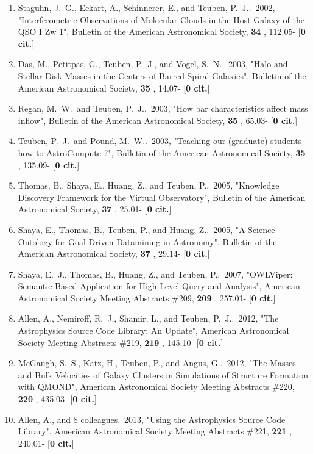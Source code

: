 \documentclass[11pt,letterpaper]{article}
\begin{document}
\begin{enumerate}[resume,label=\textbf{\arabic*}.]
\item  
Staguhn, J.~G., Eckart, A., Schinnerer, E., and Teuben, P.~J..\  2002,  
"Interferometric Observations of Molecular Clouds in the Host Galaxy of the 
QSO I Zw 1", Bulletin of the American Astronomical Society,  {\bf 34} , 
112.05- [{\bf 0 cit.}] 
\item  
Das, M., Petitpas, G., Teuben, P.~J., and Vogel, S.~N..\  2003,  "Halo and 
Stellar Disk Masses in the Centers of Barred Spiral Galaxies", Bulletin of 
the American Astronomical Society,  {\bf 35} , 14.07- [{\bf 0 cit.}] 

\item  
Regan, M.~W.~and Teuben, P.~J..\  2003,  "How bar characteristics affect 
mass inflow", Bulletin of the American Astronomical Society,  {\bf 35} , 
65.03- [{\bf 0 cit.}] 

\item  
Teuben, P.~J.~and Pound, M.~W..\  2003,  "Teaching our (graduate) students 
how to AstroCompute ?", Bulletin of the American Astronomical Society,  
{\bf 35} , 135.09- [{\bf 0 cit.}] 
\item  
Thomas, B., Shaya, E., Huang, Z., and Teuben, P..\  2005,  "Knowledge 
Discovery Framework for the Virtual Observatory", Bulletin of the American 
Astronomical Society,  {\bf 37} , 25.01- [{\bf 0 cit.}] 

\item  
Shaya, E., Thomas, B., Teuben, P., and Huang, Z..\  2005,  "A Science 
Ontology for Goal Driven Datamining in Astronomy", Bulletin of the American 
Astronomical Society,  {\bf 37} , 29.14- [{\bf 0 cit.}] 

\item  
Shaya, E.~J., Thomas, B., Huang, Z., and Teuben, P..\  2007,  "OWLViper: 
Semantic Based Application for High Level Query and Analysis", American 
Astronomical Society Meeting Abstracts \#209,  {\bf 209} , 257.01- [{\bf 0 
cit.}] 
\item  
Allen, A., Nemiroff, R.~J., Shamir, L., and Teuben, P.~J..\  2012,  "The 
Astrophysics Source Code Library: An Update", American Astronomical Society 
Meeting Abstracts \#219,  {\bf 219} , 145.10- [{\bf 0 cit.}] 

\item  
McGaugh, S.~S., Katz, H., Teuben, P., and Angus, G..\  2012,  "The Masses 
and Bulk Velocities of Galaxy Clusters in Simulations of Structure 
Formation with QMOND", American Astronomical Society Meeting Abstracts 
\#220,  {\bf 220} , 435.03- [{\bf 0 cit.}] 
\item  
Allen, A., and 8 colleagues.\  2013,  "Using the Astrophysics Source Code 
Library", American Astronomical Society Meeting Abstracts \#221,  {\bf 221} 
, 240.01- [{\bf 0 cit.}] 


\end{enumerate}
\end{document}
